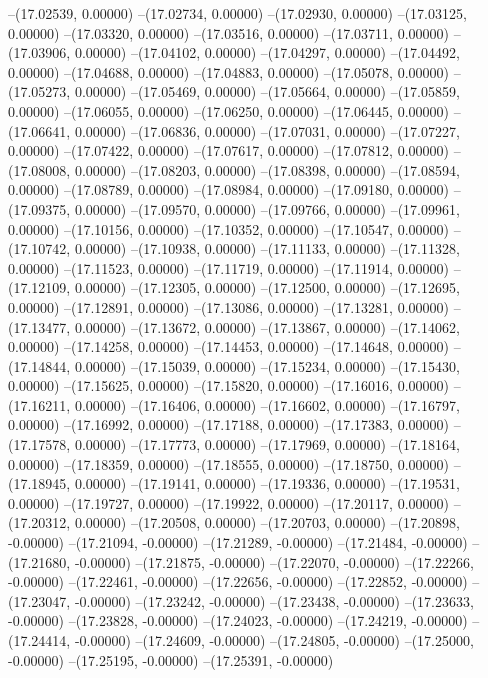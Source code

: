 --(17.02539, 0.00000)
--(17.02734, 0.00000)
--(17.02930, 0.00000)
--(17.03125, 0.00000)
--(17.03320, 0.00000)
--(17.03516, 0.00000)
--(17.03711, 0.00000)
--(17.03906, 0.00000)
--(17.04102, 0.00000)
--(17.04297, 0.00000)
--(17.04492, 0.00000)
--(17.04688, 0.00000)
--(17.04883, 0.00000)
--(17.05078, 0.00000)
--(17.05273, 0.00000)
--(17.05469, 0.00000)
--(17.05664, 0.00000)
--(17.05859, 0.00000)
--(17.06055, 0.00000)
--(17.06250, 0.00000)
--(17.06445, 0.00000)
--(17.06641, 0.00000)
--(17.06836, 0.00000)
--(17.07031, 0.00000)
--(17.07227, 0.00000)
--(17.07422, 0.00000)
--(17.07617, 0.00000)
--(17.07812, 0.00000)
--(17.08008, 0.00000)
--(17.08203, 0.00000)
--(17.08398, 0.00000)
--(17.08594, 0.00000)
--(17.08789, 0.00000)
--(17.08984, 0.00000)
--(17.09180, 0.00000)
--(17.09375, 0.00000)
--(17.09570, 0.00000)
--(17.09766, 0.00000)
--(17.09961, 0.00000)
--(17.10156, 0.00000)
--(17.10352, 0.00000)
--(17.10547, 0.00000)
--(17.10742, 0.00000)
--(17.10938, 0.00000)
--(17.11133, 0.00000)
--(17.11328, 0.00000)
--(17.11523, 0.00000)
--(17.11719, 0.00000)
--(17.11914, 0.00000)
--(17.12109, 0.00000)
--(17.12305, 0.00000)
--(17.12500, 0.00000)
--(17.12695, 0.00000)
--(17.12891, 0.00000)
--(17.13086, 0.00000)
--(17.13281, 0.00000)
--(17.13477, 0.00000)
--(17.13672, 0.00000)
--(17.13867, 0.00000)
--(17.14062, 0.00000)
--(17.14258, 0.00000)
--(17.14453, 0.00000)
--(17.14648, 0.00000)
--(17.14844, 0.00000)
--(17.15039, 0.00000)
--(17.15234, 0.00000)
--(17.15430, 0.00000)
--(17.15625, 0.00000)
--(17.15820, 0.00000)
--(17.16016, 0.00000)
--(17.16211, 0.00000)
--(17.16406, 0.00000)
--(17.16602, 0.00000)
--(17.16797, 0.00000)
--(17.16992, 0.00000)
--(17.17188, 0.00000)
--(17.17383, 0.00000)
--(17.17578, 0.00000)
--(17.17773, 0.00000)
--(17.17969, 0.00000)
--(17.18164, 0.00000)
--(17.18359, 0.00000)
--(17.18555, 0.00000)
--(17.18750, 0.00000)
--(17.18945, 0.00000)
--(17.19141, 0.00000)
--(17.19336, 0.00000)
--(17.19531, 0.00000)
--(17.19727, 0.00000)
--(17.19922, 0.00000)
--(17.20117, 0.00000)
--(17.20312, 0.00000)
--(17.20508, 0.00000)
--(17.20703, 0.00000)
--(17.20898, -0.00000)
--(17.21094, -0.00000)
--(17.21289, -0.00000)
--(17.21484, -0.00000)
--(17.21680, -0.00000)
--(17.21875, -0.00000)
--(17.22070, -0.00000)
--(17.22266, -0.00000)
--(17.22461, -0.00000)
--(17.22656, -0.00000)
--(17.22852, -0.00000)
--(17.23047, -0.00000)
--(17.23242, -0.00000)
--(17.23438, -0.00000)
--(17.23633, -0.00000)
--(17.23828, -0.00000)
--(17.24023, -0.00000)
--(17.24219, -0.00000)
--(17.24414, -0.00000)
--(17.24609, -0.00000)
--(17.24805, -0.00000)
--(17.25000, -0.00000)
--(17.25195, -0.00000)
--(17.25391, -0.00000)

